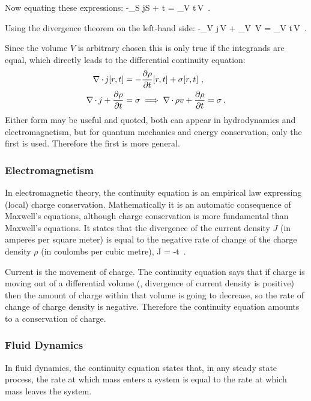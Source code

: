 Now equating these expressions:
\beq
-\int_S j\iprod\dx S + \Sigma\vat t = \int_V \xpd\rho t\,\dx V \,.
\eeq

Using the divergence theorem on the left-hand side:
\beq
-\int_V \gder\iprod j\,\dx V + \int_V \sigma{}\,\dx V = \int_V \xpd\rho t\,\dx V \,.
\eeq

Since the volume $V$ is arbitrary chosen this is only true if the integrands are equal, which directly leads to the differential continuity equation:
\begin{align*}
\nabla\operatorname{\cdot} j\!\left[{r,t}\right]     &= -\dfrac{\partial{\rho}}{\partial{t}}\!\left[{r,t}\right] + \sigma\!\left[{r,t}\right]\,,\\
\nabla\operatorname{\cdot} j + \dfrac{\partial{\rho}}{\partial{t}} &= \sigma\implies \nabla\operatorname{\cdot} \rho v + \dfrac{\partial{\rho}}{\partial{t}} = \sigma\,.
\end{align*}
Either form may be useful and quoted, both can appear in hydrodynamics and electromagnetism, but for quantum mechanics and energy conservation, only the first is used. Therefore the first is more general.


\subsubsection{Electromagnetism}
In electromagnetic theory, the continuity equation is an empirical law expressing (local) charge conservation. Mathematically it is an automatic consequence of Maxwell's equations, although charge conservation is more fundamental than Maxwell's equations. It states that the divergence of the current density $J$ (in amperes per square meter) is equal to the negative rate of change of the charge density $\rho$ (in coulombs per cubic metre),
\beq
\gder\iprod J = -\xpd\rho t \,.
\eeq

Current is the movement of charge. The continuity equation says that if charge is moving out of a differential volume (\ie, divergence of current density is positive) then the amount of charge within that volume is going to decrease, so the rate of change of charge density is negative. Therefore the continuity equation amounts to a conservation of charge.


\subsubsection{Fluid Dynamics}
In fluid dynamics, the continuity equation states that, in any steady state process, the rate at which mass enters a system is equal to the rate at which mass leaves the system.

